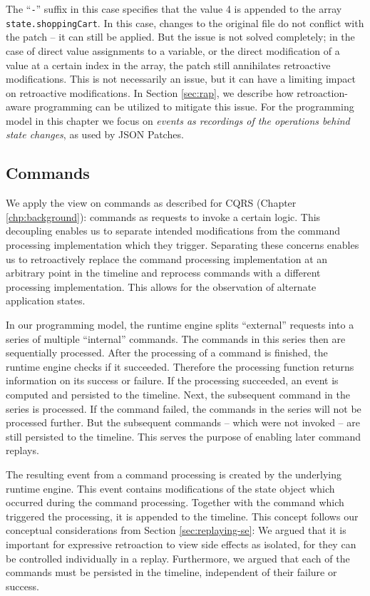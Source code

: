 The ``\texttt{-}'' suffix in this case specifies that the value 4 is appended
to the array \texttt{state.shoppingCart}. In this case, changes to the original 
file do not conflict with the patch -- it can still be applied.
But the issue is not solved completely; in the case of direct value assignments 
to a variable, or the direct modification of a value at a certain index in the 
array, the patch still annihilates retroactive modifications. This is not 
necessarily an issue, but it can have a limiting impact on retroactive modifications.
%
In Section \ref{sec:rap}, we describe how retroaction-aware programming can be 
utilized to mitigate this issue. For the programming model in this chapter we 
focus on \emph{events as recordings of the operations behind state changes}, 
as used by JSON Patches.

\subsection{Commands}
We apply the view on commands as described for CQRS (Chapter \ref{chp:background}): 
commands as requests to invoke a certain logic. This decoupling enables us to 
separate intended modifications from the command processing implementation which 
they trigger.
Separating these concerns enables us to retroactively replace the command processing 
implementation at an arbitrary point in the timeline and reprocess commands with a
different processing implementation. This allows for the observation of alternate 
application states.

In our programming model, the runtime engine splits ``external'' requests into 
a series of multiple ``internal'' commands. 
%
The commands in this series then are sequentially processed. After the processing 
of a command is finished, the runtime engine checks if it succeeded. Therefore the 
processing function returns information on its success or failure.
If the processing succeeded, an event is computed and persisted to the timeline. 
Next, the subsequent command in the series is processed. If the command failed, 
the commands in the series will not be processed further. But the subsequent 
commands -- which were not invoked -- are still persisted to the timeline. 
This serves the purpose of enabling later command replays. 

The resulting event from a command processing is created by the underlying runtime 
engine. This event contains modifications of the state object which occurred during 
the command processing. Together with the command which triggered the processing, 
it is appended to the timeline. 
%
This concept follows our conceptual considerations from Section \ref{sec:replaying-se}:
We argued that it is important for expressive retroaction to view side effects as 
isolated, for they can be controlled individually in a replay.
Furthermore, we argued that each of the commands must be persisted in the timeline, 
independent of their failure or success. %

